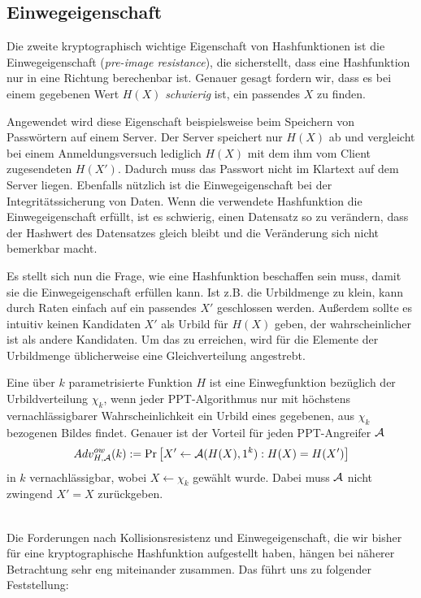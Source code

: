 \subsection{Einwegeigenschaft}
Die zweite kryptographisch wichtige Eigenschaft von Hashfunktionen ist die Einwegeigenschaft (\textit{pre-image resistance}), die sicherstellt,
dass eine Hashfunktion nur in eine Richtung berechenbar ist. Genauer gesagt fordern wir, dass es bei einem gegebenen Wert $H(X)$ \emph{schwierig} ist, ein
passendes $X$ zu finden.

Angewendet wird diese Eigenschaft beispielsweise beim Speichern von Passwörtern auf einem Server. Der Server speichert nur $H(X)$ ab und vergleicht bei
einem Anmeldungsversuch lediglich $H(X)$ mit dem ihm vom Client zugesendeten $H(X')$. Dadurch muss das Passwort nicht im Klartext auf dem Server liegen.
Ebenfalls nützlich ist die Einwegeigenschaft bei der Integritätssicherung von Daten. Wenn die verwendete Hashfunktion die Einwegeigenschaft erfüllt, ist
es schwierig, einen Datensatz so zu verändern, dass der Hashwert des Datensatzes gleich bleibt und die Veränderung sich nicht bemerkbar macht.

Es stellt sich nun die Frage, wie eine Hashfunktion beschaffen sein muss, damit sie die Einwegeigenschaft erfüllen kann. Ist z.B. die Urbildmenge zu klein, kann
durch Raten einfach auf ein passendes $X'$ geschlossen werden. Außerdem sollte es intuitiv keinen Kandidaten $X'$ als Urbild für $H(X)$ geben, der
wahrscheinlicher ist als andere Kandidaten. Um das zu erreichen, wird für die Elemente der Urbildmenge üblicherweise eine Gleichverteilung angestrebt.
\vspace{10pt}

\begin{definition}[Einwegfunktion]
Eine über $k$ parametrisierte Funktion $H$ ist eine Einwegfunktion bezüglich der Urbildverteilung $\chi_k$, wenn jeder PPT-Algorithmus nur mit höchstens
vernachlässigbarer Wahrscheinlichkeit ein Urbild eines gegebenen, aus $\chi_k$ bezogenen Bildes findet. Genauer ist der Vorteil für jeden PPT-Angreifer $\mathcal{A}$
\begin{equation*}
Adv^{ow}_{H,\mathcal{A}}(k):= \Pr \left[ X' \leftarrow \mathcal{A}(H(X), 1^k) : H(X) = H(X')\right]
\end{equation*}
in $k$ vernachlässigbar, wobei $X \leftarrow \chi_k$ gewählt wurde. Dabei muss $\mathcal{A}$ nicht zwingend $X' = X$ zurückgeben.
\end{definition}

~\\
Die Forderungen nach Kollisionsresistenz und Einwegeigenschaft, die wir bisher für eine kryptographische Hashfunktion aufgestellt haben, hängen bei näherer
Betrachtung sehr eng miteinander zusammen. Das führt uns zu folgender Feststellung:
\vspace{10pt}

